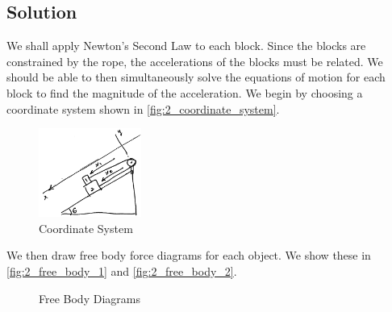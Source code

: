 \documentclass[solutions]{esg8012exam}
\begin{document}
\subsection{Solution}
  We shall apply Newton's Second Law to each block. Since the blocks are constrained by the rope, the accelerations of the blocks must be related. We should be able to then simultaneously solve the equations of motion for each block to find the magnitude of the acceleration. We begin by choosing a coordinate system shown in \autoref{fig:2_coordinate_system}.
  \begin{figure}[h!]%
    \begin{center}\includegraphics[width=0.3\textwidth]{exam1_s2_1}\end{center}%
    \caption{Coordinate System}
    \label{fig:2_coordinate_system}%
  \end{figure}
  We then draw free body force diagrams for each object. We show these in \autoref{fig:2_free_body_1} and \autoref{fig:2_free_body_2}. \par
  \begin{figure}[h!]
    \begin{center}
    \end{center}
    \caption{Free Body Diagrams}
  \end{figure}
\end{document}
